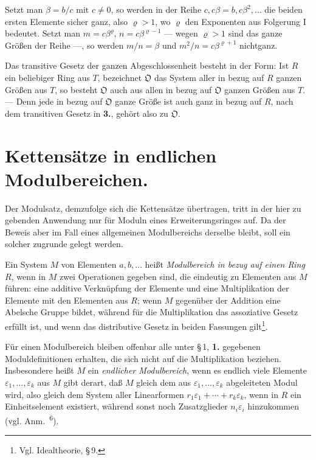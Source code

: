 \documentclass[12pt,a4paper]{article}
\newcommand{\fO}{\mathfrak{O}}
\theoremstyle{plain}
\theoremstyle{definition}
\theoremstyle{remark}
\begin{document}
Setzt man $\beta = b/c$ mit $c \neq 0$, so werden in der Reihe $c, c\beta = b, c\beta^{2},\dots$ die beiden ersten Elemente sicher ganz, also $\varrho > 1$, wo $\varrho$ den Exponenten aus Folgerung I bedeutet. Setzt man $m = c\beta^{\varrho}$, $n = c\beta^{\varrho-1}$ --- wegen $\varrho > 1$ sind das ganze Größen der Reihe ---, so werden $m/n = \beta$ und $m^{2}/n = c\beta^{\varrho+1}$ nichtganz.

Das transitive Gesetz der ganzen Abgeschlossenheit besteht in der Form: Ist $R$ ein beliebiger Ring aus $T$, bezeichnet $\fO$ das System aller in bezug auf $R$ ganzen Größen aus $T$, so besteht $\fO$ auch aus allen in bezug auf $\fO$ ganzen Größen aus $T$. --- Denn jede in bezug auf $\fO$ ganze Größe ist auch ganz in bezug auf $R$, nach dem transitiven Gesetz in \textbf{3.}, gehört also zu $\fO$.

\newpage
\section{Kettensätze in endlichen Modulbereichen.}

\noindent
Der Modulsatz, demzufolge sich die Kettensätze übertragen, tritt in der hier zu gebenden Anwendung nur für Moduln eines Erweiterungsringes auf. Da der Beweis aber im Fall eines allgemeinen Modulbereichs derselbe bleibt, soll ein solcher zugrunde gelegt werden.

Ein System $M$ von Elementen $a, b, \dots$ heißt \textit{Modulbereich in bezug auf einen Ring $R$}, wenn in $M$ zwei Operationen gegeben sind, die eindeutig zu Elementen aus $M$ führen: eine additive Verknüpfung der Elemente und eine Multiplikation der Elemente mit den Elementen aus $R$; wenn $M$ gegenüber der Addition eine Abelsche Gruppe bildet, während für die Multiplikation das assoziative Gesetz erfüllt ist, und wenn das distributive Gesetz in beiden Fassungen gilt\footnote{Vgl. Idealtheorie, \S\,9.}.

Für einen Modulbereich bleiben offenbar alle unter \S\,1, \textbf{1.} gegebenen Moduldefinitionen erhalten, die sich nicht auf die Multiplikation beziehen. Insbesondere heißt $M$ ein \textit{endlicher Modulbereich}, wenn es endlich viele Elemente $\varepsilon_{1},\dots,\varepsilon_{k}$ aus $M$ gibt derart, daß $M$ gleich dem aus $\varepsilon_{1},\dots,\varepsilon_{k}$ abgeleiteten Modul wird, also gleich dem System aller Linearformen $r_{1}\varepsilon_{1} + \cdots + r_{k}\varepsilon_{k}$, wenn in $R$ ein Einheitselement existiert, während sonst noch Zusatzglieder $n_{i}\varepsilon_{i}$ hinzukommen (vgl. Anm.\ \textsuperscript{6}).
\end{document}
